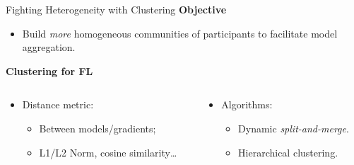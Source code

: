 % 
\begin{frame}{Fighting Heterogeneity with Clustering}
  \textbf{Objective}
  \begin{itemize}
    \item Build \emph{more} homogeneous communities of participants to facilitate model aggregation.
  \end{itemize}


    \pause
    \textbf{Clustering for FL}

    \begin{columns}
        
        \begin{column}{.5\textwidth}
            \begin{itemize}
                \item Distance metric:
                \begin{itemize}
                    \item Between models/gradients;
                    \item L1/L2 Norm, cosine similarity\dots~\cite{briggs_Federatedlearninghierarchical_2020}
                \end{itemize}
            \end{itemize}
        \end{column}
    
        \pause
        \begin{column}{.45\textwidth}
              \begin{itemize}
    
              \item Algorithms:
              \begin{itemize}
                \item Dynamic \emph{split-and-merge}.~\autocite{chen_ZeroKnowledgeClustering_2021}
                \item Hierarchical clustering.~\autocite{briggs_Federatedlearninghierarchical_2020}
              \end{itemize}
            \end{itemize}
    
        \end{column}
    \end{columns}

\end{frame}

